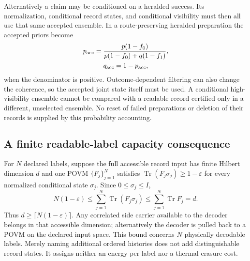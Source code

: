 Alternatively a claim may be conditioned on a heralded success. Its
normalization, conditional record states, and conditional visibility must
then all use that same accepted ensemble. In a route-preserving heralded
preparation the accepted priors become
\begin{equation}
\begin{gathered}
p_{\rm acc}=\frac{p(1-f_0)}{p(1-f_0)+q(1-f_1)},\\
 q_{\rm acc}=1-p_{\rm acc},
\end{gathered}
\label{eq:chvif-accepted-record-priors}
\end{equation}
when the denominator is positive. Outcome-dependent filtering can also
change the coherence, so the accepted joint state itself must be used.
A conditional high-visibility ensemble cannot be compared with a readable
record certified only in a different, unselected ensemble. No reset of
failed preparations or deletion of their records is supplied by this
probability accounting.

\subsection{A finite readable-label capacity consequence}
\label{sec:chvif-record-capacity}

For $N$ declared labels, suppose the full accessible record input has
finite Hilbert dimension $d$ and one POVM $\{F_j\}_{j=1}^N$ satisfies
$\operatorname{Tr}(F_j\sigma_j)\geq1-\varepsilon$ for every normalized
conditional state $\sigma_j$. Since $0\leq\sigma_j\leq I$,
\begin{equation}
 N(1-\varepsilon)
    \leq\sum_{j=1}^N\operatorname{Tr}(F_j\sigma_j)
    \leq\sum_{j=1}^N\operatorname{Tr}F_j=d.
 \label{eq:chvif-approx-readable-capacity}
\end{equation}
Thus $d\geq\lceil N(1-\varepsilon)\rceil$. Any correlated side carrier
available to the decoder belongs in that accessible dimension; alternatively
the decoder is pulled back to a POVM on the declared input space. This
bound concerns $N$ physically decodable labels. Merely naming additional
ordered histories does not add distinguishable record states. It assigns
neither an energy per label nor a thermal erasure cost.

